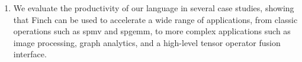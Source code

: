\begin{enumerate}
\item We evaluate the productivity of our language in several case studies,
showing that Finch can be used to accelerate a wide range of applications, 
from classic operations such as spmv and spgemm, to more complex applications such as image processing, graph analytics, and a high-level tensor operator fusion interface. 
\end{enumerate}
